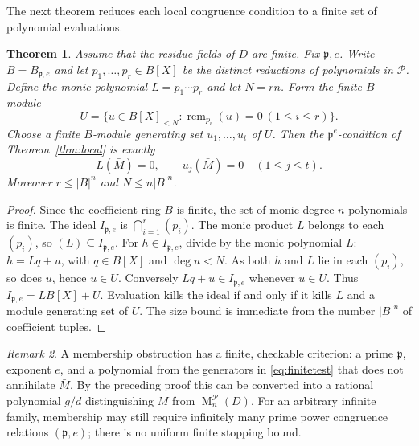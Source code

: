 \documentclass[11pt]{amsart}
\newtheorem{theorem}{Theorem}[section]
\theoremstyle{definition}
\theoremstyle{remark}
\newtheorem{remark}[theorem]{Remark}
\newcommand{\Mat}{\operatorname{M}}
\newcommand{\rem}{\operatorname{rem}}
\begin{document}
The next theorem reduces each local congruence condition to a finite set of polynomial evaluations.
\begin{theorem}\label{thm:finitelevel}
Assume that the residue fields of $D$ are finite. Fix $\mathfrak p,e$.
Write $B=B_{\mathfrak p,e}$ and let
$p_1,\ldots,p_r\in B[X]$ be the distinct reductions of polynomials in
$\mathcal P$. Define the monic polynomial
$L=p_1\cdots p_r$ and let $N=rn$.
Form the finite $B$-module
\[
U=\{u\in B[X]_{<N}:\rem_{p_i}(u)=0\ (1\le i\le r)\}.
\]
Choose a finite $B$-module generating set $u_1,\ldots,u_t$ of $U$.
Then the $\mathfrak p^e$-condition of Theorem~\ref{thm:local} is exactly
\begin{equation}\label{eq:finitetest}
L(\bar M)=0,\qquad u_j(\bar M)=0\quad(1\le j\le t).
\end{equation}
Moreover $r\le |B|^n$ and $N\le n|B|^n$.
\end{theorem}
\begin{proof}
Since the coefficient ring $B$ is finite, the set of monic degree-$n$
polynomials is finite. The ideal $I_{\mathfrak p,e}$ is
$\bigcap_{i=1}^r(p_i)$. The monic product $L$ belongs to each
$(p_i)$, so $(L)\subseteq I_{\mathfrak p,e}$. For $h\in I_{\mathfrak p,e}$,
divide by the monic polynomial $L$:
$h=Lq+u$, with $q\in B[X]$ and $\deg u<N$.
As both $h$ and $L$ lie in each $(p_i)$, so does $u$, hence $u\in U$.
Conversely $Lq+u\in I_{\mathfrak p,e}$ whenever $u\in U$.
Thus $I_{\mathfrak p,e}=L B[X]+U$. Evaluation kills the ideal
if and only if it kills $L$ and a module generating set of $U$.
The size bound is immediate from the number $|B|^n$ of coefficient tuples.
\end{proof}

\begin{remark}
A membership obstruction has a finite, checkable criterion:
a prime $\mathfrak p$, exponent $e$, and a polynomial from the generators in
\eqref{eq:finitetest} that does not annihilate $\bar M$. By the preceding proof
this can be converted into a rational polynomial $g/d$ distinguishing $M$
from $\Mat_n^{\mathcal P}(D)$. For an arbitrary infinite family, 
membership may still require infinitely many prime power congruence relations $(\mathfrak{p},e)$; there is no 
uniform finite stopping bound.
\end{remark}
\end{document}
